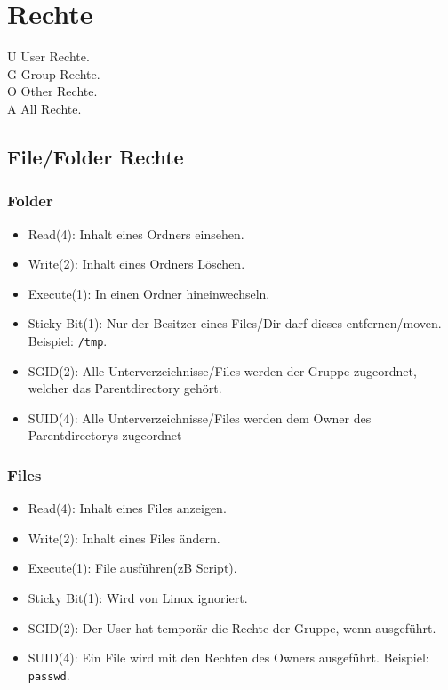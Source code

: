 \documentclass{article}
\newcommand{\cmdinline}[1]{\texttt{#1}}
\begin{document}
\section{Rechte}
U User Rechte.\\
G Group Rechte.\\
O Other Rechte.\\
A All Rechte.\\

\subsection{File/Folder Rechte}
\subsubsection{Folder}
\begin{itemize}
\item Read(4): Inhalt eines Ordners einsehen.
\item Write(2): Inhalt eines Ordners Löschen.
\item Execute(1): In einen Ordner hineinwechseln.
\item Sticky Bit(1):
  Nur der Besitzer eines Files/Dir darf dieses entfernen/moven.
  Beispiel: \cmdinline{/tmp}.
\item SGID(2):
  Alle Unterverzeichnisse/Files werden der Gruppe zugeordnet,
  welcher das Parentdirectory gehört.
\item SUID(4):
  Alle Unterverzeichnisse/Files werden dem Owner des Parentdirectorys zugeordnet
\end{itemize}

\subsubsection{Files}
\begin{itemize}
\item Read(4): Inhalt eines Files anzeigen.
\item Write(2): Inhalt eines Files ändern.
\item Execute(1): File ausführen(zB Script).
\item Sticky Bit(1): Wird von Linux ignoriert.
\item SGID(2): Der User hat temporär die Rechte der Gruppe, wenn ausgeführt.
\item SUID(4):
  Ein File wird mit den Rechten des Owners ausgeführt. Beispiel: \cmdinline{passwd}.
\end{itemize}
\end{document}
